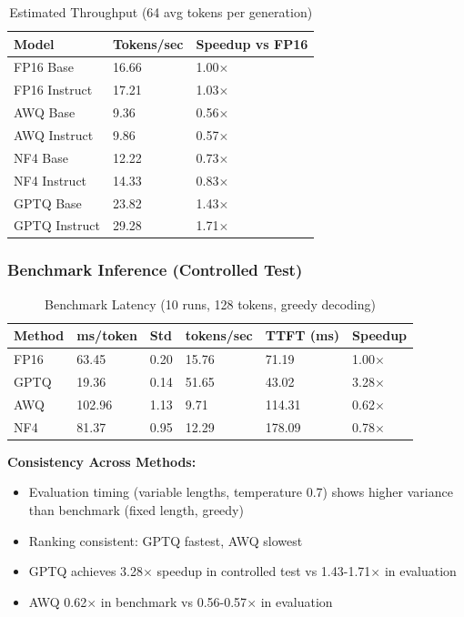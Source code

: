 \documentclass[11pt,a4paper]{article}
\begin{document}
\begin{table}[H]
\centering
\caption{Estimated Throughput (64 avg tokens per generation)}
\begin{tabularx}{\textwidth}{@{}X C{2.5cm} C{2.5cm}@{}}
\toprule
\textbf{Model} & \textbf{Tokens/sec} & \textbf{Speedup vs FP16} \\
\midrule
FP16 Base & 16.66 & 1.00$\times$ \\
FP16 Instruct & 17.21 & 1.03$\times$ \\
AWQ Base & 9.36 & 0.56$\times$ \\
AWQ Instruct & 9.86 & 0.57$\times$ \\
NF4 Base & 12.22 & 0.73$\times$ \\
NF4 Instruct & 14.33 & 0.83$\times$ \\
GPTQ Base & 23.82 & 1.43$\times$ \\
GPTQ Instruct & 29.28 & 1.71$\times$ \\
\bottomrule
\end{tabularx}
\end{table}

\subsubsection{Benchmark Inference (Controlled Test)}

\begin{table}[H]
\centering
\caption{Benchmark Latency (10 runs, 128 tokens, greedy decoding)}
\small
\begin{tabularx}{\textwidth}{@{}l C{1.8cm} C{1.6cm} C{1.6cm} C{1.6cm} C{1.8cm}@{}}
\toprule
\textbf{Method} & \textbf{ms/token} & \textbf{Std} & \textbf{tokens/sec} & \textbf{TTFT (ms)} & \textbf{Speedup} \\
\midrule
FP16 & 63.45 & 0.20 & 15.76 & 71.19 & 1.00$\times$ \\
GPTQ & 19.36 & 0.14 & 51.65 & 43.02 & 3.28$\times$ \\
AWQ & 102.96 & 1.13 & 9.71 & 114.31 & 0.62$\times$ \\
NF4 & 81.37 & 0.95 & 12.29 & 178.09 & 0.78$\times$ \\
\bottomrule
\end{tabularx}
\end{table}

\textbf{Consistency Across Methods:}
\begin{itemize}
\item Evaluation timing (variable lengths, temperature 0.7) shows higher variance than benchmark (fixed length, greedy)
\item Ranking consistent: GPTQ fastest, AWQ slowest
\item GPTQ achieves 3.28$\times$ speedup in controlled test vs 1.43-1.71$\times$ in evaluation
\item AWQ 0.62$\times$ in benchmark vs 0.56-0.57$\times$ in evaluation
\end{itemize}
\end{document}
